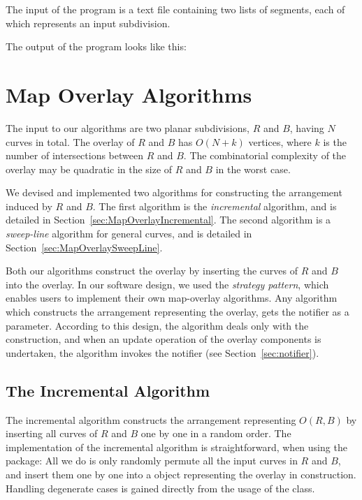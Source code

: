 The input of the program is a text file containing two lists of segments, 
each of which represents an input subdivision.

The output of the program looks like this:

\section{Map Overlay Algorithms}
\label{sec:algorithms}
The input to our algorithms are two planar subdivisions, 
$R$ and $B$, having $N$ curves in total. 
The overlay of $R$ and $B$ has $O(N+k)$ vertices, 
where $k$ is the number of intersections between $R$ and $B$.
The combinatorial complexity of the overlay may be quadratic 
in the size of $R$ and $B$ in the worst case.

We devised and implemented two algorithms for constructing the 
arrangement induced by $R$ and $B$.
The first algorithm is the {\em incremental} algorithm, and is detailed in Section~\ref{sec:MapOverlayIncremental}. 
The second algorithm is a {\em sweep-line} algorithm 
for general curves, and is detailed in 
Section~\ref{sec:MapOverlaySweepLine}.

Both our algorithms construct the overlay by inserting 
the curves of $R$ and $B$ into the overlay.
In our software design, we used the {\it strategy pattern}, 
which enables users to implement their own map-overlay algorithms.
Any algorithm which constructs the arrangement representing 
the overlay, gets the notifier as a parameter. 
According to this design, the algorithm deals only with the construction, 
and when an update operation of the overlay components is undertaken, 
the algorithm invokes the notifier (see Section~\ref{sec:notifier}). 

\subsection*{The Incremental Algorithm}
\label{sec:MapOverlayIncremental}
The incremental algorithm constructs the arrangement representing 
$O(R,B)$ by inserting all curves of $R$ and $B$ one by one in a 
random order. 
The implementation of the incremental algorithm is straightforward, 
when using the  package: All we 
do is only randomly permute all the input curves in $R$ and $B$, 
and insert them one by one into a 
 object representing the 
overlay in construction.
Handling degenerate cases is gained directly from the usage of the 
 class.

